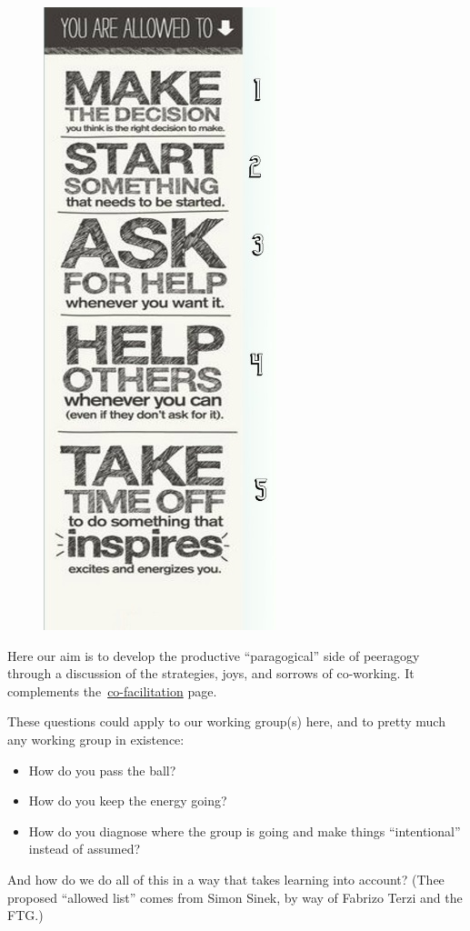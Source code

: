 \begin{figure}
\includegraphics[width=.4\textwidth]{../pictures/allowed-list.jpg}
\vspace{-50pt}
\end{figure} Here our aim is to develop the productive ``paragogical'' side of
peeragogy through a discussion of the strategies, joys, and sorrows of
co-working. It complements
the~\href{http://socialmediaclassroom.com/host/peeragogy/freelinking/Co-Working}{co-facilitation}
page.

These questions could apply to our working group(s) here, and to pretty
much any working group in existence:

\begin{itemize}
\item
  How do you pass the ball?
\item
  How do you keep the energy going?
\item
  How do you diagnose where the group is going and make things
  ``intentional'' instead of assumed?
\end{itemize}

And how do we do all of this in a way that takes learning into account?
(Thee proposed ``allowed list'' comes from Simon Sinek, by way of
Fabrizo Terzi and the FTG.)

